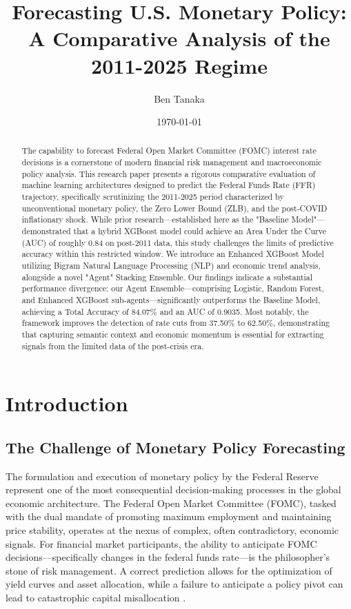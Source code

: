 \documentclass[11pt, a4paper]{article}
\title{\textbf{Forecasting U.S. Monetary Policy: A Comparative Analysis of the 2011-2025 Regime}}
\author{Ben Tanaka}
\date{\today}
\begin{document}
\maketitle

\begin{abstract}
\noindent The capability to forecast Federal Open Market Committee (FOMC) interest rate decisions is a cornerstone of modern financial risk management and macroeconomic policy analysis. This research paper presents a rigorous comparative evaluation of machine learning architectures designed to predict the Federal Funds Rate (FFR) trajectory, specifically scrutinizing the 2011-2025 period characterized by unconventional monetary policy, the Zero Lower Bound (ZLB), and the post-COVID inflationary shock. While prior research—established here as the "Baseline Model"—demonstrated that a hybrid XGBoost model could achieve an Area Under the Curve (AUC) of roughly 0.84 on post-2011 data, this study challenges the limits of predictive accuracy within this restricted window. We introduce an Enhanced XGBoost Model utilizing Bigram Natural Language Processing (NLP) and economic trend analysis, alongside a novel "Agent" Stacking Ensemble. Our findings indicate a substantial performance divergence: our Agent Ensemble—comprising Logistic, Random Forest, and Enhanced XGBoost sub-agents—significantly outperforms the Baseline Model, achieving a Total Accuracy of 84.07\% and an AUC of 0.9035. Most notably, the framework improves the detection of rate cuts from 37.50\% to 62.50\%, demonstrating that capturing semantic context and economic momentum is essential for extracting signals from the limited data of the post-crisis era.
\end{abstract}

\section{Introduction}

\subsection{The Challenge of Monetary Policy Forecasting}
The formulation and execution of monetary policy by the Federal Reserve represent one of the most consequential decision-making processes in the global economic architecture. The Federal Open Market Committee (FOMC), tasked with the dual mandate of promoting maximum employment and maintaining price stability, operates at the nexus of complex, often contradictory, economic signals. For financial market participants, the ability to anticipate FOMC decisions—specifically changes in the federal funds rate—is the philosopher's stone of risk management. A correct prediction allows for the optimization of yield curves and asset allocation, while a failure to anticipate a policy pivot can lead to catastrophic capital misallocation \cite{ref1}.
\end{document}
